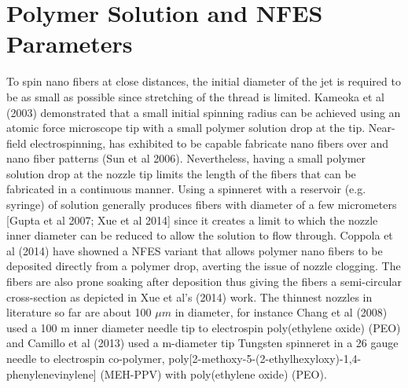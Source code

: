 \documentclass[3p,,preprint,12pt]{elsarticle}
\begin{document}
    
\section{Polymer Solution and NFES Parameters}
To spin nano fibers at close distances, the initial diameter of the jet is required to be as small as possible since stretching of the thread is limited. Kameoka et al (2003) demonstrated that a small initial spinning radius can be achieved using an atomic force microscope tip with a small polymer solution drop at the tip. Near-field electrospinning, has exhibited to be capable fabricate nano fibers over and nano fiber patterns (Sun et al 2006). Nevertheless, having a small polymer solution drop at the nozzle tip limits the length of the fibers that can be fabricated in a continuous manner. Using a spinneret with a reservoir (e.g. syringe) of solution generally produces fibers with diameter of a few micrometers [Gupta et al 2007; Xue et al 2014] since it creates a limit to which the nozzle inner diameter can be reduced to allow the solution to flow through. Coppola et al (2014) have showned a NFES variant that allows polymer nano fibers to be deposited directly from a polymer drop,  averting the issue of nozzle clogging. The fibers are also prone soaking after deposition thus giving the fibers a semi-circular cross-section as depicted in Xue et al's (2014) work. The thinnest nozzles in literature so far are about 100 $\mu m $ in diameter, for instance Chang et al (2008) used a 100 \textmu m inner diameter needle tip to electrospin poly(ethylene oxide) (PEO) and Camillo et al (2013) used a \textmu m-diameter tip Tungsten spinneret in a 26 gauge needle to electrospin co-polymer, poly[2-methoxy-5-(2-ethylhexyloxy)-1,4-phenylenevinylene] (MEH-PPV) with poly(ethylene oxide) (PEO).
\end{document}
